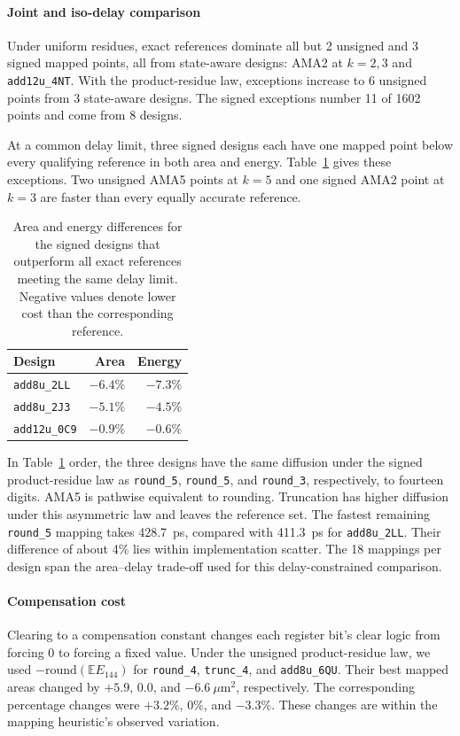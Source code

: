\documentclass[11pt]{article}
\newcommand{\E}{\mathbb{E}}
\begin{document}
\paragraph{Joint and iso-delay comparison}
Under uniform residues, exact references dominate all but 2 unsigned and 3
signed mapped points, all from state-aware designs: AMA2 at
$k=2,3$ and \texttt{add12u\_4NT}. With the product-residue law, exceptions
increase to 6 unsigned points from 3 state-aware designs. The signed
exceptions number 11 of 1602 points and come from 8 designs.

At a common delay limit, three signed designs each have one mapped point
below every qualifying reference in both area and energy.
Table~\ref{tab:isodelay} gives these exceptions. Two unsigned AMA5 points
at $k=5$ and one signed AMA2 point at $k=3$ are faster than every equally
accurate reference.

\begin{table}[t]
\centering
\caption{Area and energy differences for the signed designs that outperform
all exact references meeting the same delay limit. Negative values denote
lower cost than the corresponding reference.}
\label{tab:isodelay}
\begin{tabular}{lrr}
\toprule
Design & Area & Energy\\
\midrule
\texttt{add8u\_2LL} & $-6.4\%$ & $-7.3\%$\\
\texttt{add8u\_2J3} & $-5.1\%$ & $-4.5\%$\\
\texttt{add12u\_0C9} & $-0.9\%$ & $-0.6\%$\\
\bottomrule
\end{tabular}
\end{table}

In Table~\ref{tab:isodelay} order, the three designs have the same
diffusion under the signed product-residue law as \texttt{round\_5},
\texttt{round\_5}, and \texttt{round\_3}, respectively, to fourteen
digits. AMA5 is pathwise equivalent to rounding.
Truncation has higher diffusion under this asymmetric law and leaves the
reference set. The fastest remaining \texttt{round\_5} mapping takes
428.7~ps, compared with 411.3~ps for \texttt{add8u\_2LL}. Their
difference of about 4\% lies within implementation scatter.
The 18 mappings per design span the area--delay trade-off used for this
delay-constrained comparison.

\paragraph{Compensation cost}
Clearing to a compensation constant changes each register bit's clear logic
from forcing 0 to forcing a fixed value. Under the unsigned product-residue law, we
used $-\mathrm{round}(\E E_{144})$ for \texttt{round\_4},
\texttt{trunc\_4}, and \texttt{add8u\_6QU}. Their best mapped areas changed
by $+5.9$, $0.0$, and $-6.6~\mu$m$^2$, respectively. The corresponding
percentage changes were $+3.2\%$, $0\%$, and $-3.3\%$. These changes are
within the mapping heuristic's observed variation.
\end{document}
